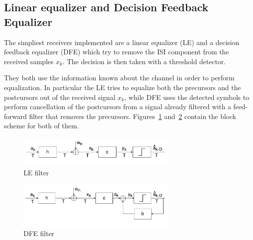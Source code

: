 \documentclass[10pt]{article}
\begin{document}
\subsection*{Linear equalizer and Decision Feedback Equalizer}
The simpliest receivers implemented are a linear equalizer (LE) and a decision feedback equalizer (DFE) which try to remove the ISI component from the received samples $x_k$. The decision is then taken with a threshold detector. 

They both use the information known about the channel in order to perform equalization. In particular the LE tries to equalize both the precursors and the postcursors out of the received signal $x_k$, while DFE uses the detected symbols to perform cancellation of the postcursors from a signal already filtered with a feed-forward filter that removes the precursors. Figures~\ref{fig:LE} and~\ref{fig:DFE} contain the block scheme for both of them. 
\begin{figure}[h!]
	\centering
	\includegraphics[width = 0.7\textwidth]{LE}
	\caption{LE filter}
	\label{fig:LE}
\end{figure}

\begin{figure}[h!]
	\centering
	\includegraphics[width=0.7\textwidth]{DFE}
	\caption{DFE filter}
	\label{fig:DFE}
\end{figure}
\end{document}
